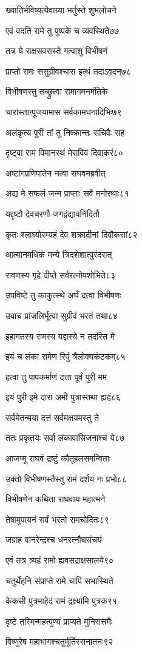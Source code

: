 ख्यातिर्भविष्यत्येवाग्र्या भर्तुस्ते शुभलोचने

एवं वदति रामे तु पुष्पके च व्यवस्थिते७७

तत्र ये राक्षसवरास्ते गत्वाशु विभीषणं

प्राप्तो रामः ससुग्रीवश्चारा इत्थं तदाऽवदन्७८

विभीषणस्तु तच्छ्रुत्वा रामागमनमंतिके

चारांस्तान्पूजयामास सर्वकामधनादिभिः७९

अलंकृत्य पुरीं तां तु निष्क्रान्तः सचिवैः सह

दृष्ट्वा रामं विमानस्थं मेराविव दिवाकरं८०

अष्टांगप्रणिपातेन नत्वा राघवमब्रवीत्

अद्य मे सफलं जन्म प्राप्ताः सर्वे मनोरथाः८१

यद्दृष्टौ देवचरणौ जगद्वंद्यावनिंदितौ

कृतः श्लाघ्योस्म्यहं देव शक्रादीनां दिवौकसां८२

आत्मानमधिकं मन्ये त्रिदशेशात्पुरंदरात्

रावणस्य गृहे दीप्ते सर्वरत्नोपशोभिते८३

उपविष्टे तु काकुत्स्थे अर्घं दत्वा विभीषणः

उवाच प्रांजलिर्भूत्वा सुग्रीवं भरतं तथा८४

इहागतस्य रामस्य यद्दास्ये न तदस्ति मे

इयं च लंका रामेण रिपुं त्रैलोक्यकंटकम्८५

हत्वा तु पापकर्माणं दत्ता पूर्वं पुरी मम

इयं पुरी इमे दारा अमी पुत्रास्तथा ह्यहं८६

सर्वमेतन्मया दत्तं सर्वमक्षयमस्तु ते

ततः प्रकृतयः सर्वा लंकावासिजनाश्च ये८७

आजग्मू राघवं द्रष्टुं कौतूहलसमन्विताः

उक्तो विभीषणस्तैस्तु रामं दर्शय नः प्रभो८८

विभीषणेन कथिता राघवाय महात्मने

तेषामुपायनं सर्वं भरतो रामचोदितः८९

जग्राह वानरेन्द्रश्च धनरत्नौघसंचयं

एवं तत्र त्र्यहं रामो ह्यवसद्राक्षसालये९०

चतुर्थेहनि संप्राप्ते रामे चापि सभास्थिते

केकसी पुत्रमाहेदं रामं द्रक्ष्यामि पुत्रक९१

दृष्टे तस्मिन्महत्पुण्यं प्राप्यते मुनिसत्तमैः

विष्णुरेष महाभागश्चतुर्मूर्तिस्सनातनः९२

